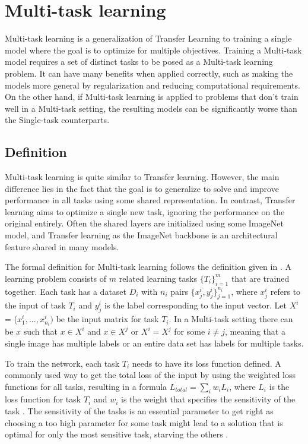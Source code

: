 \chapter{Multi-task learning}
Multi-task learning is a generalization of Transfer Learning to training a single model where the goal is to optimize for multiple objectives.
Training a Multi-task model requires a set of distinct tasks to be posed as a Multi-task learning problem.
It can have many benefits when applied correctly, such as making the models more general by regularization and reducing computational requirements.
On the other hand, if Multi-task learning is applied to problems that don't train well in a Multi-task setting, the resulting models can be significantly worse than the Single-task counterparts.

\section{Definition}
Multi-task learning is quite similar to Transfer learning.
However, the main difference lies in the fact that the goal is to generalize to solve and improve performance in all tasks using some shared representation.
In contrast, Transfer learning aims to optimize a single new task, ignoring the performance on the original entirely.
Often the shared layers are initialized using some ImageNet model, and Transfer learning as the ImageNet backbone is an architectural feature shared in many models.

The formal definition for Multi-task learning follows the definition given in \citep{surveyOnMultiTask}.
A learning problem consists of ${m}$ related learning tasks ${\{T_i\}_{i=1}^m}$ that are trained together.
Each task has a dataset ${D_i}$ with ${n_i}$ pairs ${\{x_{j}^{i}, y_{j}^{i}\}_{j=1}^{n_i}}$, where ${x_{j}^{i}}$ refers to the input of task ${T_i}$ and ${y_{j}^{i}}$ is the label corresponding to the input vector.
Let ${X^i}$ = (${x_{1}^{i}, ... , x_{n_i}^{i})}$ be the input matrix for task ${T_i}$.
In a Multi-task setting there can be ${x}$ such that ${x \in X^i}$ and ${x \in X^j}$ or ${X^i = X^j}$ for some ${i \ne j}$, meaning that a single image has multiple labels or an entire data set has labels for multiple tasks.

To train the network, each task ${T_i}$ needs to have its loss function defined.
A commonly used way to get the total loss of the input by using the weighted loss functions for all tasks, resulting in a formula ${L_{total} = \sum_i{w_i L_i}}$, where ${L_i}$ is the loss function for task ${T_i}$ and ${w_i}$ is the weight that specifies the sensitivity of the task \citep{usingUncertaintyToWeighLosses}.
The sensitivity of the tasks is an essential parameter to get right as choosing a too high parameter for some task might lead to a solution that is optimal for only the most sensitive task, starving the others \citep{whichTasks}.

